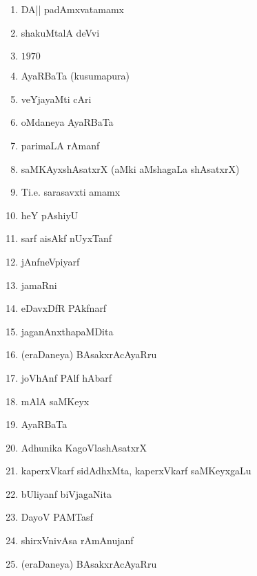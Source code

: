 \begin{enumerate}
\item DA|| padAmxvatamamx

\item shakuMtalA deVvi

\item $1970$

\item AyaRBaTa (kusumapura)

\item veYjayaMti cAri

\item oMdaneya AyaRBaTa

\item parimaLA rAmanf

\item saMKAyxshAsatxrX (aMki aMshagaLa shAsatxrX)

\item Ti.e. sarasavxti amamx 

\item heY pAshiyU

\item sarf aisAkf nUyxTanf

\item jAnfneVpiyarf

\item jamaRni

\item eDavxDfR PAkfnarf

\item jaganAnxthapaMDita

\item (eraDaneya) BAsakxrAcAyaRru

\item joVhAnf PAlf hAbarf

\item mAlA saMKeyx

\item AyaRBaTa

\item Adhunika KagoVlashAsatxrX

\item kaperxVkarf sidAdhxMta, kaperxVkarf saMKeyxgaLu

\item bUliyanf biVjagaNita

\item DayoV PAMTasf

\item shirxVnivAsa rAmAnujanf

\item (eraDaneya) BAsakxrAcAyaRru


\end{enumerate}
